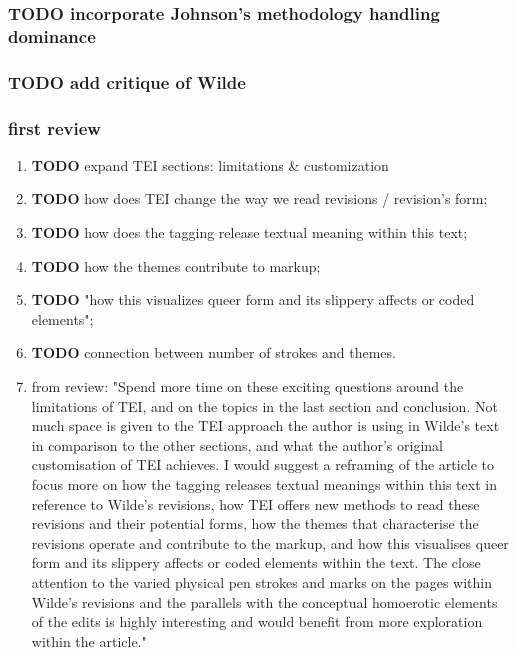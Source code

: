 \documentclass[11pt]{article}
\begin{document}
\subsubsection{{\bfseries\sffamily TODO} incorporate Johnson's methodology handling dominance}
\label{sec:org2ba6418}
\subsubsection{{\bfseries\sffamily TODO} add critique of Wilde}
\label{sec:org4980156}


\subsubsection{first review}
\label{sec:org9977d39}

\begin{enumerate}
\item {\bfseries\sffamily TODO} expand TEI sections: limitations \& customization
\label{sec:org7ef95bc}
\item {\bfseries\sffamily TODO} how does TEI change the way we read revisions / revision's form;
\label{sec:orgc5482af}
\item {\bfseries\sffamily TODO} how does the tagging release textual meaning within this text;
\label{sec:orgf0ededf}
\item {\bfseries\sffamily TODO} how the themes contribute to markup;
\label{sec:org33e6732}
\item {\bfseries\sffamily TODO} "how this visualizes queer form and its slippery affects or coded
\label{sec:org90be71d}
elements";
\item {\bfseries\sffamily TODO} connection between number of strokes and themes.
\label{sec:org9341d3d}
\item from review:
\label{sec:org94f094a}
"Spend more time on these exciting questions around the limitations of
TEI, and on the topics in the last section and conclusion. Not much
space is given to the TEI approach the author is using in Wilde’s text
in comparison to the other sections, and what the author’s original
customisation of TEI achieves. I would suggest a reframing of the
article to focus more on how the tagging releases textual meanings
within this text in reference to Wilde’s revisions, how TEI offers new
methods to read these revisions and their potential forms, how the
themes that characterise the revisions operate and contribute to the
markup, and how this visualises queer form and its slippery affects or
coded elements within the text. The close attention to the varied
physical pen strokes and marks on the pages within Wilde’s revisions
and the parallels with the conceptual homoerotic elements of the edits
is highly interesting and would benefit from more exploration within
the article."


\end{enumerate}
\end{document}

